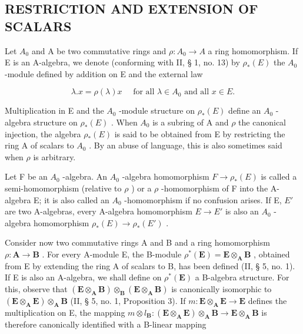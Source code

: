 \subsection{RESTRICTION AND EXTENSION OF SCALARS}

Let \(A_{0}\) and A be two commutative rings and \(\rho:A_{0}\to A\) a ring homomorphism. If E is an A-algebra, we denote (conforming with II, § 1, no. 13) by \(\rho_{*}(E)\) the \(A_{0}\) -module defined by addition on E and the external law

\[
\lambda . x = \rho (\lambda) x \quad \text { for   all } \lambda \in A _ {0} \text { and   all } x \in E.
\]

Multiplication in E and the \(A_{0}\) -module structure on \(\rho_{*}(E)\) define an \(A_{0}\) -algebra structure on \(\rho_{*}(E)\) . When \(A_{0}\) is a subring of A and \(\rho\) the canonical injection, the algebra \(\rho_{*}(E)\) is said to be obtained from E by restricting the ring A of scalars to \(A_{0}\) . By an abuse of language, this is also sometimes said when \(\rho\) is arbitrary.

Let F be an \(A_{0}\) -algebra. An \(A_{0}\) -algebra homomorphism \(F \to \rho_{*}(E)\) is called a semi-homomorphism (relative to \(\rho\) ) or a \(\rho\) -homomorphism of F into the A-algebra E; it is also called an \(A_{0}\) -homomorphism if no confusion arises. If E, \(E'\) are two A-algebras, every A-algebra homomorphism \(E \to E'\) is also an \(A_{0}\) -algebra homomorphism \(\rho_{*}(E) \to \rho_{*}(E')\) .

Consider now two commutative rings A and B and a ring homomorphism \(\rho: \mathbf{A} \to \mathbf{B}\) . For every A-module E, the B-module \(\rho^{*}(\mathbf{E}) = \mathbf{E} \otimes_{\mathbf{A}} \mathbf{B}\) , obtained from E by extending the ring A of scalars to B, has been defined (II, § 5, no. 1). If E is also an A-algebra, we shall define on \(\rho^{*}(\mathbf{E})\) a B-algebra structure. For this, observe that \((\mathbf{E} \otimes_{\mathbf{A}} \mathbf{B}) \otimes_{\mathbf{B}} (\mathbf{E} \otimes_{\mathbf{A}} \mathbf{B})\) is canonically isomorphic to \((\mathbf{E} \otimes_{\mathbf{A}} \mathbf{E}) \otimes_{\mathbf{A}} \mathbf{B}\) (II, § 5, no. 1, Proposition 3). If \(m: \mathbf{E} \otimes_{\mathbf{A}} \mathbf{E} \to \mathbf{E}\) defines the multiplication on E, the mapping \(m \otimes l_{\mathbf{B}}: (\mathbf{E} \otimes_{\mathbf{A}} \mathbf{E}) \otimes_{\mathbf{A}} \mathbf{B} \to \mathbf{E} \otimes_{\mathbf{A}} \mathbf{B}\) is therefore canonically identified with a B-linear mapping

